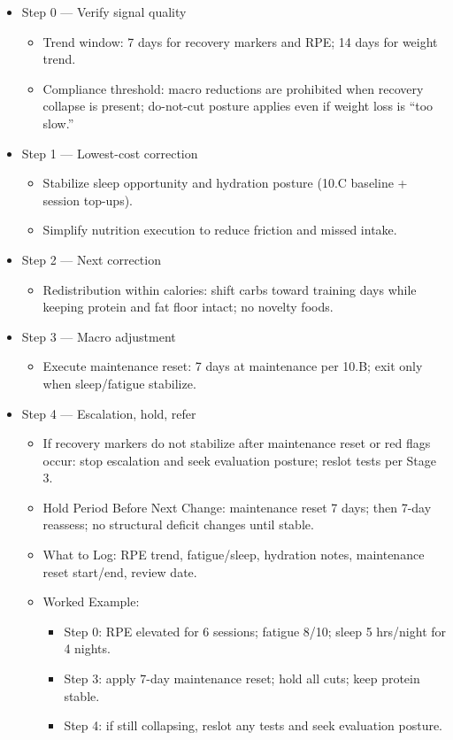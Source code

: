 \documentclass[10pt]{article}
\begin{document}
\begin{itemize}
\item Step 0 — Verify signal quality
  \begin{itemize}
  \item Trend window: 7 days for recovery markers and RPE; 14 days for weight trend.
  \item Compliance threshold: macro reductions are prohibited when recovery collapse is present; do-not-cut posture applies even if weight loss is “too slow.”
  \end{itemize}
\item Step 1 — Lowest-cost correction
  \begin{itemize}
  \item Stabilize sleep opportunity and hydration posture (10.C baseline + session top-ups).
  \item Simplify nutrition execution to reduce friction and missed intake.
  \end{itemize}
\item Step 2 — Next correction
  \begin{itemize}
  \item Redistribution within calories: shift carbs toward training days while keeping protein and fat floor intact; no novelty foods.
  \end{itemize}
\item Step 3 — Macro adjustment
  \begin{itemize}
  \item Execute maintenance reset: 7 days at maintenance per 10.B; exit only when sleep/fatigue stabilize.
  \end{itemize}
\item Step 4 — Escalation, hold, refer
  \begin{itemize}
  \item If recovery markers do not stabilize after maintenance reset or red flags occur: stop escalation and seek evaluation posture; reslot tests per Stage 3.
  \item Hold Period Before Next Change: maintenance reset 7 days; then 7-day reassess; no structural deficit changes until stable.
  \item What to Log: RPE trend, fatigue/sleep, hydration notes, maintenance reset start/end, review date.
  \item Worked Example:
    \begin{itemize}
    \item Step 0: RPE elevated for 6 sessions; fatigue 8/10; sleep 5 hrs/night for 4 nights.
    \item Step 3: apply 7-day maintenance reset; hold all cuts; keep protein stable.
    \item Step 4: if still collapsing, reslot any tests and seek evaluation posture.
    \end{itemize}
  \end{itemize}
\end{itemize}
\end{document}

